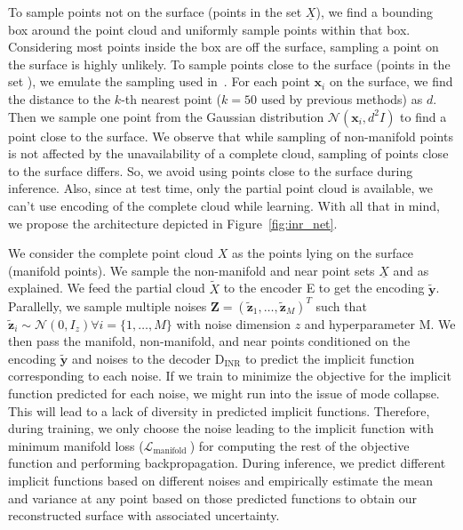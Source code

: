     To sample points not on the surface (points in the set $\underline{X}$), we find a bounding box around the point cloud and uniformly sample points within that box. Considering most points inside the box are off the surface, sampling a point on the surface is highly unlikely. To sample points close to the surface (points in the set ), we emulate the sampling used in~\cite{IGR, SALD, NeuralHessian}. For each point $\mathbf{x}_i$ on the surface, we find the distance to the $k$-th nearest point ($k=50$ used by previous methods) as $d$. Then we sample one point from the Gaussian distribution $\mathcal{N}(\mathbf{x}_i, d^2I)$ to find a point close to the surface. We observe that while sampling of non-manifold points is not affected by the unavailability of a complete cloud, sampling of points close to the surface differs. So, we avoid using points close to the surface during inference. Also, since at test time, only the partial point cloud is available, we can't use encoding of the complete cloud while learning. With all that in mind, we propose the architecture depicted in Figure~\ref{fig:inr_net}.

    We consider the complete point cloud $X$ as the points lying on the surface (manifold points). We sample the non-manifold and near point sets $\underline{X}$ and  as explained. We feed the partial cloud $\tilde{X}$ to the encoder E to get the encoding $\mathbf{\tilde{y}}$. Parallelly, we sample multiple noises $\mathbf{Z} = (\mathbf{\tilde{z}}_1, \ldots, \mathbf{\tilde{z}}_M)^T$ such that $\mathbf{\tilde{z}}_i \sim \mathcal{N}(0, I_z) \forall i=\{1, \ldots, M\}$ with noise dimension $z$ and hyperparameter M. We then pass the manifold, non-manifold, and near points conditioned on the encoding $\mathbf{\tilde{y}}$ and noises to the decoder D$_{\text{INR}}$ to predict the implicit function corresponding to each noise. If we train to minimize the objective for the implicit function predicted for each noise, we might run into the issue of mode collapse. This will lead to a lack of diversity in predicted implicit functions. Therefore, during training, we only choose the noise leading to the implicit function with minimum manifold loss ($\mathcal{L}_{\text {manifold }}$) for computing the rest of the objective function and performing backpropagation. During inference, we predict different implicit functions based on different noises and empirically estimate the mean and variance at any point based on those predicted functions to obtain our reconstructed surface with associated uncertainty.

